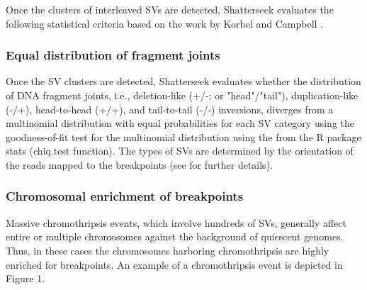 \documentclass[twoside,a4wide,11pt]{article}\usepackage[]{graphicx}\usepackage[]{color}
\begin{document}
Once the clusters of interleaved SVs are detected, Shatterseek evaluates the following statistical criteria based on the work by Korbel and Campbell \cite{Korbel2013}.


\subsubsection{Equal distribution of fragment joints}

Once the SV clusters are detected, Shatterseek evaluates whether the distribution of DNA fragment joints,
i.e., deletion-like (+/-; or "head"/"tail"), duplication-like (-/+), head-to-head (+/+), and tail-to-tail (-/-) inversions,
diverges from a multinomial distribution with equal probabilities for each SV category using the goodness-of-fit test for the multinomial distribution using the from the R package stats (chiq.test function).
The types of SVs are determined by the orientation of the reads mapped to the breakpoints (see \cite{Zhang2013} for further details).

\subsubsection{Chromosomal enrichment of breakpoints}
Massive chromothripsis events, which involve hundreds of SVs,
generally affect entire or multiple chromosomes against the background of 
quiescent genomes.
Thus, in these cases the chromosomes harboring chromothripsis are highly enriched for breakpoints.
An example of a chromothripsis event is depicted in Figure 1.
\end{document}
